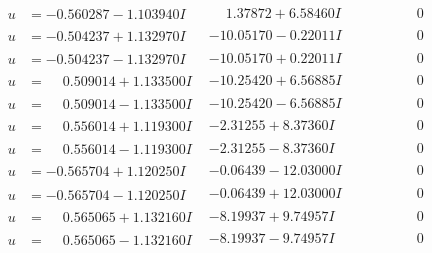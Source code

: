 \documentclass[1p]{elsarticle_modified}
\theoremstyle{definition}
\begin{document}
$$\begin{array}{c|c|c}
\begin{aligned}
u &= -0.560287 - 1.103940 I\end{aligned}
 & \phantom{-}1.37872 + 6.58460 I & \phantom{-0.000000 } 0 \\ \hline\begin{aligned}
u &= -0.504237 + 1.132970 I\end{aligned}
 & -10.05170 - 0.22011 I & \phantom{-0.000000 } 0 \\ \hline\begin{aligned}
u &= -0.504237 - 1.132970 I\end{aligned}
 & -10.05170 + 0.22011 I & \phantom{-0.000000 } 0 \\ \hline\begin{aligned}
u &= \phantom{-}0.509014 + 1.133500 I\end{aligned}
 & -10.25420 + 6.56885 I & \phantom{-0.000000 } 0 \\ \hline\begin{aligned}
u &= \phantom{-}0.509014 - 1.133500 I\end{aligned}
 & -10.25420 - 6.56885 I & \phantom{-0.000000 } 0 \\ \hline\begin{aligned}
u &= \phantom{-}0.556014 + 1.119300 I\end{aligned}
 & -2.31255 + 8.37360 I & \phantom{-0.000000 } 0 \\ \hline\begin{aligned}
u &= \phantom{-}0.556014 - 1.119300 I\end{aligned}
 & -2.31255 - 8.37360 I & \phantom{-0.000000 } 0 \\ \hline\begin{aligned}
u &= -0.565704 + 1.120250 I\end{aligned}
 & -0.06439 - 12.03000 I & \phantom{-0.000000 } 0 \\ \hline\begin{aligned}
u &= -0.565704 - 1.120250 I\end{aligned}
 & -0.06439 + 12.03000 I & \phantom{-0.000000 } 0 \\ \hline\begin{aligned}
u &= \phantom{-}0.565065 + 1.132160 I\end{aligned}
 & -8.19937 + 9.74957 I & \phantom{-0.000000 } 0 \\ \hline\begin{aligned}
u &= \phantom{-}0.565065 - 1.132160 I\end{aligned}
 & -8.19937 - 9.74957 I & \phantom{-0.000000 } 0 \\ \hline\begin{aligned}

\end{aligned}
\end{array}$$
\end{document}
